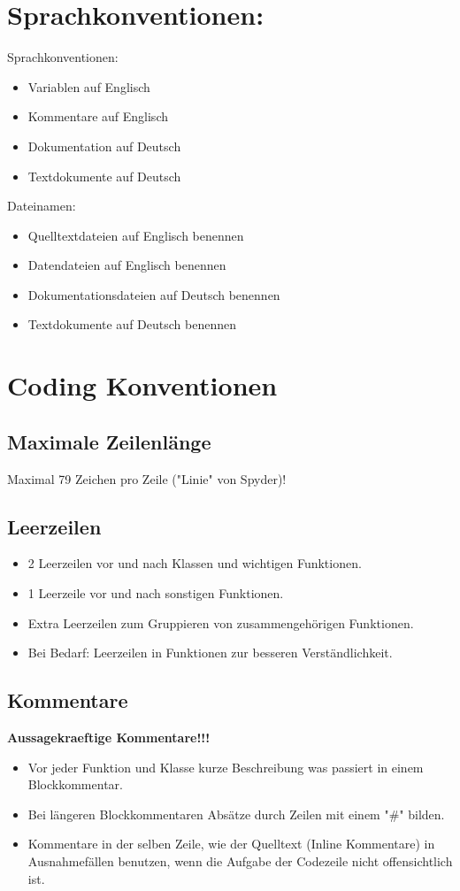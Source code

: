 \documentclass[11pt]{scrartcl}
\begin{document}
	\section{Sprachkonventionen:}
		Sprachkonventionen:
		\begin{itemize}
			\item Variablen auf Englisch
			\item Kommentare auf Englisch
			\item Dokumentation auf Deutsch
			\item Textdokumente auf Deutsch
		\end{itemize}
		Dateinamen:
		\begin{itemize}
			\item Quelltextdateien auf Englisch benennen
			\item Datendateien auf Englisch benennen
			\item Dokumentationsdateien auf Deutsch benennen
			\item Textdokumente auf Deutsch benennen
		\end{itemize}
	\section{Coding Konventionen}
		\subsection{Maximale Zeilenlänge}
			Maximal 79 Zeichen pro Zeile ("Linie" von Spyder)!
		\subsection{Leerzeilen}
			\begin{itemize}
				\item[] 2 Leerzeilen vor und nach Klassen und wichtigen Funktionen.
				\item[] 1 Leerzeile vor und nach sonstigen Funktionen.
				\item[] Extra Leerzeilen zum Gruppieren von zusammengehörigen Funktionen.
				\item[] Bei Bedarf: Leerzeilen in Funktionen zur besseren Verständlichkeit.
			\end{itemize}
		\subsection{Kommentare}
			\textbf{Aussagekraeftige Kommentare!!!}
			\begin{itemize}
				\item[] Vor jeder Funktion und Klasse kurze Beschreibung was passiert in einem Blockkommentar.
				\item[] Bei längeren Blockkommentaren Absätze durch Zeilen mit einem "\#" bilden.
				\item[] Kommentare in der selben Zeile, wie der Quelltext (Inline Kommentare) in Ausnahmefällen benutzen, wenn die Aufgabe der Codezeile nicht offensichtlich ist.
			\end{itemize}
\end{document}
